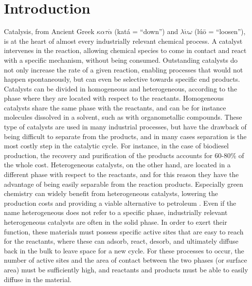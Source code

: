 \graphicspath{{figures/chapter1/}}
\renewcommand\evenpagerightmark{{\scshape\small Introduction}}
\renewcommand\oddpageleftmark{{\scshape\small Chapter 1}}


\hyphenation{}

\chapter[Introduction]%
{Introduction}
\label{ch1}

Catalysis, from Ancient Greek $\kappa\alpha\tau\acute{\alpha}$ (kat\'a = ``down'') and $\lambda\acute{\upsilon}\omega$ (l\'u\=o = ``loosen''), is at the heart of almost every industrially relevant chemical process. A catalyst intervenes in the reaction, allowing chemical species to come in contact and react with a specific mechanism, without being consumed. Outstanding catalysts do not only increase the rate of a given reaction, enabling processes that would not happen spontaneously, but can even be selective towards specific end products. Catalysts can be divided in homogeneous and heterogeneous, according to the phase where they are located with respect to the reactants. Homogeneous catalysts share the same phase with the reactants, and can be for instance molecules dissolved in a solvent, such as with organometallic compounds. These type of catalysts are used in many industrial processes, but have the drawback of being difficult to separate from the products, and in many cases separation is the most costly step in the catalytic cycle. For instance, in the case of biodiesel production, the recovery and purification of the products accounts for 60-80\% of the whole cost\cite{atadashi2011biodiesel}.
\npar
Heterogeneous catalysts, on the other hand, are located in a different phase with respect to the reactants, and for this reason they have the advantage of being easily separable from the reaction products. Especially green chemistry can widely benefit from heterogeneous catalysts, lowering the production costs and providing a viable alternative to petroleum \cite{chouhan2011modern}. Even if the name heterogeneous does not refer to a specific phase, industrially relevant heterogeneous catalysts are often in the solid phase. In order to exert their function, these materials must possess specific active sites that are easy to reach for the reactants, where these can adsorb, react, desorb, and ultimately diffuse back in the bulk to leave space for a new cycle. For these processes to occur, the number of active sites and the area of contact between the two phases (or surface area) must be sufficiently high, and reactants and products must be able to easily diffuse in the material. 
